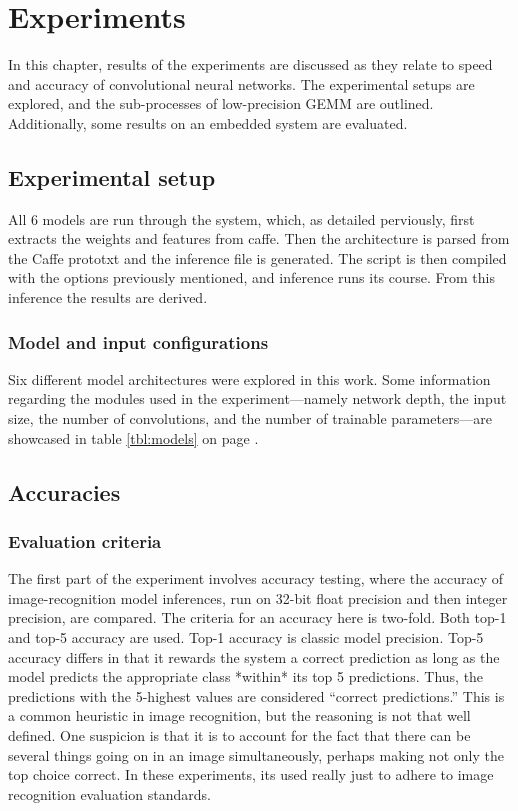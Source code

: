 \chapter{Experiments}
In this chapter, results of the experiments are discussed as they relate to speed and accuracy of convolutional neural networks. The experimental setups are explored, and the sub-processes of low-precision GEMM are outlined. Additionally, some results on an embedded system are evaluated.

\section{Experimental setup}
All 6 models are run through the system, which, as detailed perviously, first extracts the weights and features from caffe. Then the architecture is parsed from the Caffe prototxt and the inference file is generated. The script is then compiled with the options previously mentioned, and inference runs its course. From this inference the results are derived.

\subsection{Model and input configurations}
Six different model architectures were explored in this work. Some information regarding the modules used in the experiment---namely network depth, the input size, the number of convolutions, and the number of trainable parameters---are showcased in table \ref{tbl:models} on page \pageref{tbl:models}.

\section{Accuracies}
\subsection{Evaluation criteria}
The first part of the experiment involves accuracy testing, where the accuracy of image-recognition model inferences, run on 32-bit float precision and then integer precision, are compared. The criteria for an accuracy here is two-fold. Both top-1 and top-5 accuracy are used. Top-1 accuracy is classic model precision. Top-5 accuracy differs in that it rewards the system a correct prediction as long as the model predicts the appropriate class *within* its top 5 predictions. Thus, the predictions with the 5-highest values are considered ``correct predictions.'' This is a common heuristic in image recognition, but the reasoning is not that well defined. One suspicion is that it is to account for the fact that there can be several things going on in an image simultaneously, perhaps making not only the top choice correct. In these experiments, its used really just to adhere to image recognition evaluation standards.

